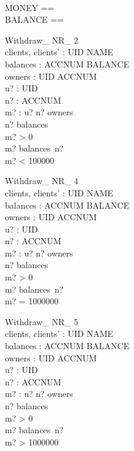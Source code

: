 \begin{zed}
 \\
MONEY == \nat \\
BALANCE == \nat
\end{zed}

\begin{schema}{Withdraw\_ NR\_ 2}\\
 clients, clients' : UID \pfun NAME \\
 balances : ACCNUM \pfun BALANCE \\
 owners : UID \rel ACCNUM \\
 u? : UID \\
 n? : ACCNUM \\
 m? : \nat 
\where
 u? \mapsto n? \in owners \\
 n? \in \dom balances \\
 m? > 0 \\
 m? \leq balances~n? \\
 m? < 100000
\end{schema}

\begin{schema}{Withdraw\_ NR\_ 4}\\
 clients, clients' : UID \pfun NAME \\
 balances : ACCNUM \pfun BALANCE \\
 owners : UID \rel ACCNUM \\
 u? : UID \\
 n? : ACCNUM \\
 m? : \nat 
\where
 u? \mapsto n? \in owners \\
 n? \in \dom balances \\
 m? > 0 \\
 m? \leq balances~n? \\
 m? = 1000000
\end{schema}


\begin{schema}{Withdraw\_ NR\_ 5}\\
 clients, clients' : UID \pfun NAME \\
 balances : ACCNUM \pfun BALANCE \\
 owners : UID \rel ACCNUM \\
 u? : UID \\
 n? : ACCNUM \\
 m? : \nat 
\where
 u? \mapsto n? \in owners \\
 n? \in \dom balances \\
 m? > 0 \\
 m? \leq balances~n? \\
 m? > 1000000
\end{schema}

